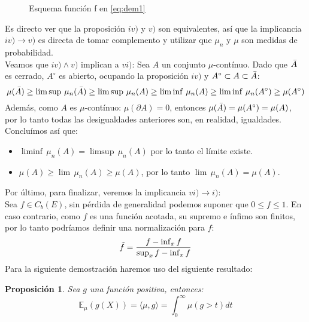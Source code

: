 \documentclass[a4paper]{article}
\newtheorem{prop}{Proposici\'on}
\numberwithin{equation}{subsection}
\def\E{\mathbb E}
\begin{document}
\begin{figure}
\centering
    \caption{Esquema función f en \ref{eq:dem1}}
\end{figure}
\newpage
Es directo ver que la proposición $iv)$ y $v)$ son equivalentes, así que la implicancia $iv) \rightarrow v)$ es directa de tomar complemento y utilizar que $\mu_n$ y $\mu$ son medidas de probabilidad.\\ \newline
Veamos que $iv)\land v)$ implican a $vi)$: Sea $A$ un conjunto $\mu$-contínuo. Dado que $\Bar{A}$ es cerrado, $A^{\circ}$ es abierto, ocupando la proposición $iv)$ y $A^{\circ} \subset A\subset \Bar{A}$:
\[\mu(\Bar{A}) \geq \limsup\,\mu_n(\Bar{A}) \geq \limsup\,\mu_n(A)\geq \liminf\,\mu_n(A) \geq \liminf\,\mu_n(A^{\circ})\geq \mu(A^{\circ})\]
Además, como $A$ es $\mu$-contínuo: $\mu(\partial A) = 0$, entonces $\mu(\Bar{A}) = \mu(A^{\circ}) = \mu(A)$, por lo tanto todas las desigualdades anteriores son, en realidad, igualdades. Concluímos así que:
\begin{itemize}
    \item $\liminf\,\mu_n(A) = \limsup\,\mu_n(A)$ por lo tanto el límite existe.
    \item $\mu(A)\geq \lim\,\mu_n(A)\geq \mu(A)$, por lo tanto $\lim\,\mu_n(A) = \mu(A)$.
\end{itemize}
Por último, para finalizar, veremos la implicancia $vi)\rightarrow i)$:\\ \newline
Sea $f\in C_b(E)$, sin pérdida de generalidad podemos suponer que $0\leq f\leq 1$. En caso contrario, como $f$ es una función acotada, su supremo e ínfimo son finitos, por lo tanto podríamos definir una normalización para $f$:
\[\Tilde{f} = \frac{f - \inf_x f}{\sup_x f - \inf_x f}\]
Para la siguiente demostración haremos uso del siguiente resultado:
\begin{prop} Sea $g$ una función positiva, entonces:
    \begin{equation}
        \E_{\mu}(g(X)) = \langle\mu,g\rangle = \int_0^{\infty}\mu(g>t)dt
    \end{equation}
\end{prop}
\end{document}
